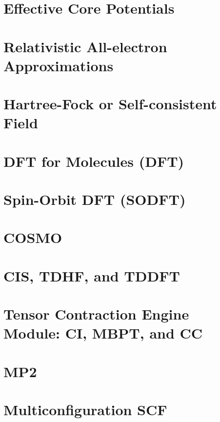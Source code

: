 \chapter{Effective Core Potentials}


\chapter{Relativistic All-electron Approximations}


\chapter{Hartree-Fock or Self-consistent Field} 


\chapter{DFT for Molecules (DFT)}


\chapter{Spin-Orbit DFT (SODFT)}


\chapter{COSMO}


%

\chapter{CIS, TDHF, and TDDFT}


\chapter{Tensor Contraction Engine Module: CI, MBPT, and CC}


\chapter{MP2}


\chapter{Multiconfiguration SCF}


